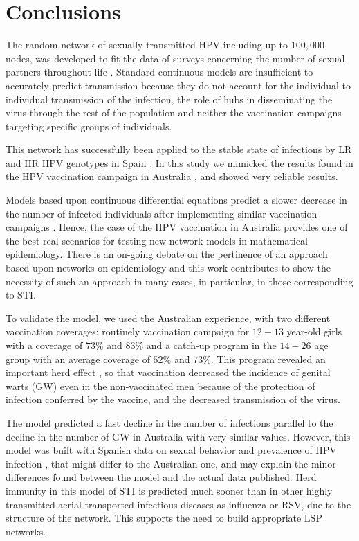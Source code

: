 \chapter{Conclusions}
The random network of sexually transmitted HPV including up to $100,000$ nodes, was developed to fit the data of surveys concerning the number of sexual partners throughout life \cite{Acedo2017,DezDomingo2017}. Standard continuous models are insufficient to accurately predict transmission because they do not account for the individual to individual transmission of the infection, the role of hubs in disseminating the virus through the rest of the population and neither the vaccination campaigns targeting specific groups of individuals.

This network has successfully been applied to the stable state of infections by LR and HR HPV genotypes in Spain  \cite{Acedo2017}. In this study we mimicked the results found in the HPV vaccination campaign in Australia \cite{ali2013genital}, and showed very reliable results. 

Models based upon continuous differential equations predict a slower decrease in the number of infected individuals after implementing similar vaccination campaigns \cite{elbasha2007model}. Hence, the case of the HPV vaccination in Australia provides one of the best real scenarios for testing new network models in mathematical epidemiology. There is an on-going debate on the pertinence of an approach based upon networks on epidemiology \cite{Eubank} and this work contributes to show the necessity of such an approach in many cases, in particular, in those corresponding to STI.

To validate the model, we used the Australian experience, with two different vaccination coverages: routinely vaccination campaign for $12-13$ year-old girls with a coverage of $73\%$ and $83\%$ and a catch-up program in the $14-26$ age group with an average coverage of $52\%$ and $73\%$. This program revealed an important herd effect \cite{ali2013genital}, so that vaccination decreased the incidence of genital warts (GW) even in the non-vaccinated men because of the protection of infection conferred by the vaccine, and the decreased transmission of the virus.

The model predicted a fast decline in the number of infections parallel to the decline in the number of GW in Australia with very similar values. However, this model was built with Spanish data on sexual behavior \cite{INE} and prevalence of HPV infection \cite{castellsague2012prevalence}, that might differ to the Australian one, and may explain the minor differences found between the model and the actual data published. Herd immunity in this model of STI is predicted much sooner than in other highly transmitted aerial transported infectious diseases as influenza or RSV, due to the structure of the network. This supports the need to build appropriate LSP networks. 

